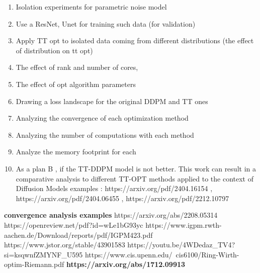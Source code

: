 \documentclass[11pt]{article}
\begin{document}

    \begin{enumerate}
        \item Isolation experiments for parametric noise model
        \item Use a ResNet, Unet for training such data (for validation)
        \item Apply TT opt to isolated data coming from different distributions (the effect of distribution on tt opt)
        \item The effect of rank and number of cores,
        \item The effect of opt algorithm parameters
        \item Drawing a loss landscape for the original DDPM and TT ones
        \item Analyzing the convergence of each optimization method
        \item Analyzing the number of computations with each method
        \item Analyze the memory footprint for each
        \item As a plan B , if the TT-DDPM model is not better.
        This work can result in a comparative analysis to different TT-OPT methods applied to the context of Diffusion Models
        examples : https://arxiv.org/pdf/2404.16154 , https://arxiv.org/pdf/2404.06455 , https://arxiv.org/pdf/2212.10797

    \end{enumerate}
    \textbf{convergence analysis examples}
    https://arxiv.org/abs/2208.05314
    https://openreview.net/pdf?id=wLe1bG93yc
    https://www.igpm.rwth-aachen.de/Download/reports/pdf/IGPM423.pdf
    https://www.jstor.org/stable/43901583
    https://youtu.be/4WDedaz_TV4?si=ksqwnfZMYNF_U595
    https://www.cis.upenn.edu/~cis6100/Ring-Wirth-optim-Riemann.pdf
    \textbf{https://arxiv.org/abs/1712.09913}
\end{document}
